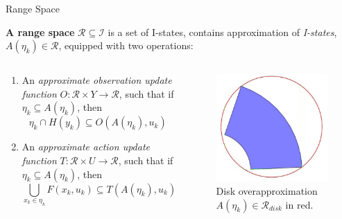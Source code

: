 \begin{frame}{Range Space}
\begin{definition}{\textbf{A range space}}
 $\mathcal{R} \subseteq \mathcal{I}$ is a set of I-states, contains
 approximation of \emph{I-states}, $A(\eta_k) \in \mathcal{R}$, equipped with
 two operations:
\end{definition}
\begin{columns}
\begin{column}{.5\textwidth}
\begin{enumerate}
\item An \emph{approximate observation update function} $O: \mathcal{R} \times
		Y \to \mathcal{R}$, such that if $\eta_k \subseteq A(\eta_k)$, then
			$$\eta_k \cap H(y_k) \subseteq O(A(\eta_k), u_k)$$
\item An \emph{approximate action update function} $T: \mathcal{R} \times U \to
		\mathcal{R}$, such that if $\eta_k \subseteq A(\eta_k)$, then
			$$\bigcup_{x_k \in \eta_k} F(x_k, u_k) \subseteq T(A(\eta_k), u_k)$$
\end{enumerate}
\end{column}
\begin{column}{.4\textwidth}
  \begin{figure}
    \includegraphics[scale=0.3]{figs/rangespace_circle.jpg}
    \caption{Disk overapproximation $A(\eta_k) \in \mathcal{R}_{disk}$ in red.}
    \end{figure}
\end{column}
\end{columns}
\end{frame}

